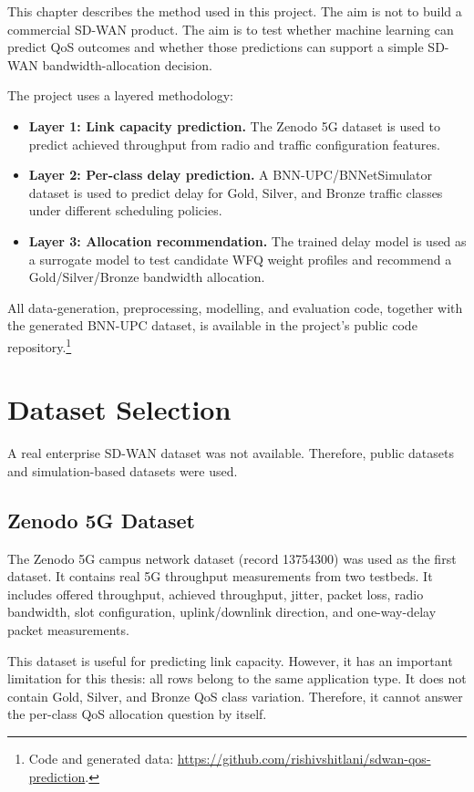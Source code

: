 \documentclass[a4paper,12pt]{Classes/RoboticsLaTeX}
\begin{document}
This chapter describes the method used in this project. The aim is not to build a commercial SD-WAN product. The aim is to test whether machine learning can predict QoS outcomes and whether those predictions can support a simple SD-WAN bandwidth-allocation decision.

The project uses a layered methodology:

\begin{itemize}
    \item \textbf{Layer 1: Link capacity prediction.} The Zenodo 5G dataset is used to predict achieved throughput from radio and traffic configuration features.
    \item \textbf{Layer 2: Per-class delay prediction.} A BNN-UPC/BNNetSimulator dataset is used to predict delay for Gold, Silver, and Bronze traffic classes under different scheduling policies.
    \item \textbf{Layer 3: Allocation recommendation.} The trained delay model is used as a surrogate model to test candidate WFQ weight profiles and recommend a Gold/Silver/Bronze bandwidth allocation.
\end{itemize}

All data-generation, preprocessing, modelling, and evaluation code, together with the generated BNN-UPC dataset, is available in the project's public code repository.\footnote{Code and generated data: \url{https://github.com/rishivshitlani/sdwan-qos-prediction}.}

\section{Dataset Selection}

A real enterprise SD-WAN dataset was not available. Therefore, public datasets and simulation-based datasets were used.

\subsection{Zenodo 5G Dataset}

The Zenodo 5G campus network dataset (record 13754300) was used as the first dataset. It contains real 5G throughput measurements from two testbeds. It includes offered throughput, achieved throughput, jitter, packet loss, radio bandwidth, slot configuration, uplink/downlink direction, and one-way-delay packet measurements.

This dataset is useful for predicting link capacity. However, it has an important limitation for this thesis: all rows belong to the same application type. It does not contain Gold, Silver, and Bronze QoS class variation. Therefore, it cannot answer the per-class QoS allocation question by itself.
\end{document}
